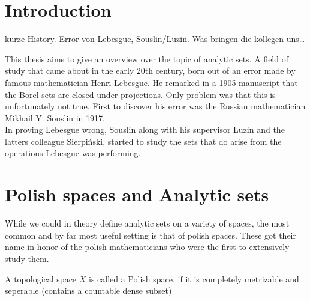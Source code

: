 \documentclass[10pt, a4paper, titlepage]{article}
\numberwithin{equation}{section}
\begin{document}
\hypersetup{pageanchor=false}


\newpage

\thispagestyle{empty}



\newpage

\tableofcontents

\newpage
\hypersetup{pageanchor=true}
\renewcommand{\thepage}{ \arabic{page} }

\setcounter{page}{1}
\onehalfspacing







\section{Introduction}
kurze History. Error von Lebesgue, Souslin/Luzin. Was bringen die kollegen uns\ldots

This thesis aims to give an overview over the topic of analytic sets. 
A field of study that came about in the early 20th century, born out of an error made by famous mathematician Henri Lebesgue. 
He remarked in a 1905 manuscript that the Borel sets are closed under projections. 
Only problem was that this is unfortunately not true. 
First to discover his error was the Russian mathematician Mikhail Y. Souslin in 1917. \cite{rogers1980}
\\
In proving Lebesgue wrong, Souslin along with his supervisor Luzin and the latters colleague Sierpiński, started to study the sets that do arise from the operations Lebesgue was performing.





\section{Polish spaces and Analytic sets}
While we could in theory define analytic sets on a variety of spaces, the most common and by far most useful setting is that of polish spaces. These got their name in  honor of the polish mathematicians who were the first to extensively study them.

\begin{definition}
	A topological space $X$ is called a Polish space, if it is completely metrizable and seperable (contains a countable dense subset)
\end{definition}
\end{document}

